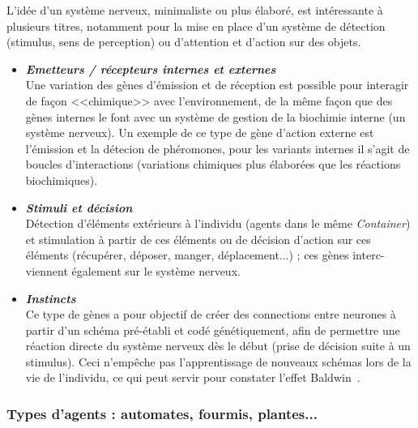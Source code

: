 \documentclass[11pt,twoside,a4paper]{article}
\begin{document}
L'id{\'e}e d'un syst{\`e}me nerveux, minimaliste ou plus {\'e}labor{\'e}, est int{\'e}ressante {\`a} plusieurs titres, notamment pour la mise en place d'un syst{\`e}me de d{\'e}tection (stimulus, sens de perception) ou d'attention et d'action sur des objets. 
	\begin{itemize}
		\item \textbf{\emph{Emetteurs / r{\'e}cepteurs internes et externes}}~\\
Une variation des g{\`e}nes d'{\'e}mission et de r{\'e}ception est possible pour interagir de fa\c{c}on <<chimique>> avec l'environnement, de la m{\^e}me fa\c{c}on que des g{\`e}nes internes le font avec un syst{\`e}me de gestion de la biochimie interne (un syst{\`e}me nerveux). Un exemple de ce type de g{\`e}ne d'action externe est l'{\'e}mission et la d{\'e}tecion de ph{\'e}romones, pour les variants internes il s'agit de boucles d'interactions (variations chimiques plus {\'e}labor{\'e}es que les r{\'e}actions biochimiques). 
		\item \textbf{\emph{Stimuli et d{\'e}cision}}~\\
		D{\'e}tection d'{\'e}l{\'e}ments ext{\'e}rieurs {\`a} l'individu (agents dans le m{\^e}me \emph{Container}) et stimulation {\`a} partir de ces {\'e}l{\'e}ments ou de d{\'e}cision d'action sur ces {\'e}l{\'e}ments (r{\'e}cup{\'e}rer, d{\'e}poser, manger, d{\'e}placement...) ; ces g{\`e}nes interc-viennent {\'e}galement sur le syst{\`e}me nerveux. 
		\item \textbf{\emph{Instincts}}~\\
Ce type de g{\`e}nes a pour objectif de cr{\'e}er des connections entre neurones {\`a} partir d'un sch{\'e}ma pr{\'e}-{\'e}tabli et cod{\'e} g{\'e}n{\'e}tiquement, afin de permettre une r{\'e}action directe du syst{\`e}me nerveux d{\`e}s le d{\'e}but (prise de d{\'e}cision suite {\`a} un stimulus). Ceci n'emp{\^e}che pas l'apprentissage de nouveaux sch{\'e}mas lors de la vie de l'individu, ce qui peut servir pour constater l'effet Baldwin~\cite{baldwin1896}. 
	\end{itemize}

\subsubsection{Types d'agents : automates, fourmis, plantes...}
\end{document}
